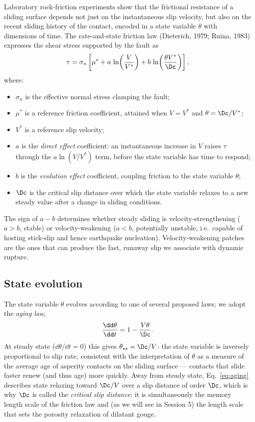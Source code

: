 Laboratory rock-friction experiments show that the frictional resistance of a sliding surface depends not just on the instantaneous slip velocity, but also on the recent sliding history of the contact, encoded in a state variable $\theta$ with dimensions of time. The rate-and-state friction law (Dieterich, 1979; Ruina, 1983) expresses the shear stress supported by the fault as
\begin{equation}
\tau = \sigma_n\left[\mu^\ast + a\,\ln\!\left(\frac{V}{V^\ast}\right) + b\,\ln\!\left(\frac{\theta V^\ast}{\Dc}\right)\right],
\label{eq:rsf}
\end{equation}
where:
\begin{itemize}
\item $\sigma_n$ is the effective normal stress clamping the fault;
\item $\mu^\ast$ is a reference friction coefficient, attained when $V = V^\ast$ and $\theta = \Dc / V^\ast$;
\item $V^\ast$ is a reference slip velocity;
\item $a$ is the \emph{direct effect} coefficient: an instantaneous increase in $V$ raises $\tau$ through the $a\ln(V/V^\ast)$ term, before the state variable has time to respond;
\item $b$ is the \emph{evolution effect} coefficient, coupling friction to the state variable $\theta$;
\item $\Dc$ is the critical slip distance over which the state variable relaxes to a new steady value after a change in sliding conditions.
\end{itemize}
The sign of $a - b$ determines whether steady sliding is velocity-strengthening ($a > b$, stable) or velocity-weakening ($a < b$, potentially unstable, i.e.\ capable of hosting stick-slip and hence earthquake nucleation). Velocity-weakening patches are the ones that can produce the fast, runaway slip we associate with dynamic rupture.

\subsection{State evolution}

The state variable $\theta$ evolves according to one of several proposed laws; we adopt the \emph{aging law},
\begin{equation}
\frac{\dd \theta}{\dd t} = 1 - \frac{V\theta}{\Dc}.
\label{eq:aging}
\end{equation}
At steady state ($\dd\theta/\dd t = 0$) this gives $\theta_{ss} = \Dc / V$: the state variable is inversely proportional to slip rate, consistent with the interpretation of $\theta$ as a measure of the average age of asperity contacts on the sliding surface --- contacts that slide faster renew (and thus age) more quickly. Away from steady state, Eq.~\eqref{eq:aging} describes state relaxing toward $\Dc/V$ over a slip distance of order $\Dc$, which is why $\Dc$ is called the \emph{critical slip distance}: it is simultaneously the memory length scale of the friction law and (as we will see in Session 5) the length scale that sets the porosity relaxation of dilatant gouge.

